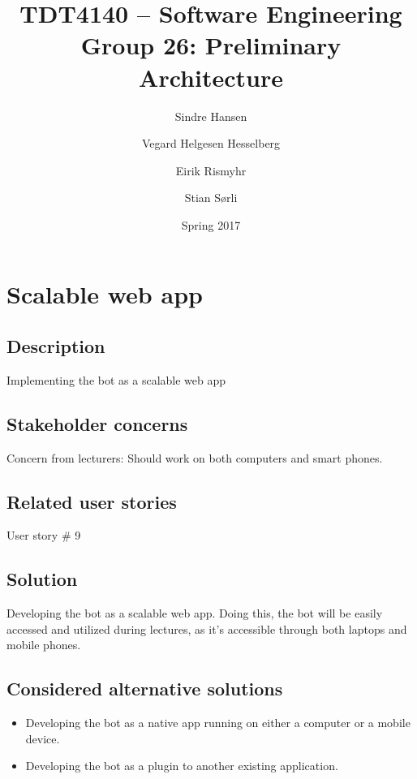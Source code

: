\documentclass[12pt, a4paper]{article}
\title{TDT4140 -- Software Engineering \\ Group 26: Preliminary Architecture}
\author{Sindre Hansen \and Vegard Helgesen Hesselberg \and Eirik Rismyhr \and Stian Sørli}
\date{Spring 2017}
\begin{document}
\maketitle
\tableofcontents
\thispagestyle{empty}
\clearpage
\setcounter{page}{1}
\section{Scalable web app}
\subsection{Description}
Implementing the bot as a scalable web app
\subsection{Stakeholder concerns}
Concern from lecturers: Should work on both computers and smart phones. 
\subsection{Related user stories}
User story \# 9
\subsection{Solution}
Developing the bot as a scalable web app. Doing this, the bot will be easily accessed and utilized during lectures, as it's accessible through both laptops and mobile phones. 
\subsection{Considered alternative solutions}
\begin{itemize}
    \item Developing the bot as a native app running on either a computer or a mobile device.
    \item Developing the bot as a plugin to another existing application.
\end{itemize}
\end{document}
